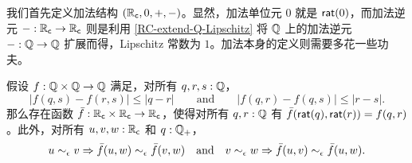 我们首先定义加法结构 $(\mathbb{R}_\mathsf{c}, 0, {+}, {-})$。显然，加法单位元 $0$ 就是 $\mathsf{rat}(0)$，而加法逆元 ${-} : \mathbb{R}_\mathsf{c} \to \mathbb{R}_\mathsf{c}$ 则是利用 \cref{RC-extend-Q-Lipschitz} 将 $\mathbb{Q}$ 上的加法逆元 ${-} : \mathbb{Q} \to \mathbb{Q}$ 扩展而得，Lipschitz 常数为 $1$。加法本身的定义则需要多花一些功夫。

\begin{lem} \label{RC-binary-nonexpanding-extension}
  假设 $f : \mathbb{Q} \times \mathbb{Q} \to \mathbb{Q}$ 满足，对所有 $q, r, s : \mathbb{Q}$，
  \begin{equation*}
    |f(q, s) - f(r, s)| \leq |q - r|
    \qquad\text{and}\qquad
    |f(q, r) - f(q, s)| \leq |r - s|.
  \end{equation*}
  那么存在函数 $\bar{f} : \mathbb{R}_\mathsf{c} \times \mathbb{R}_\mathsf{c} \to \mathbb{R}_\mathsf{c}$，使得对所有 $q, r : \mathbb{Q}$ 有 $\bar{f}(\mathsf{rat}(q), \mathsf{rat}(r)) = f(q,r)$。此外，对所有 $u, v, w : \mathbb{R}_\mathsf{c}$ 和 $q : \mathbb{Q}_{+}$，
  \begin{equation*}
    u \sim_{\epsilon} v \Rightarrow \bar{f}(u,w) \sim_{\epsilon} \bar{f}(v,w)
    \quad\text{and}\quad
    v \sim_{\epsilon} w \Rightarrow \bar{f}(u,v) \sim_{\epsilon} \bar{f}(u,w).
  \end{equation*}
\end{lem}

